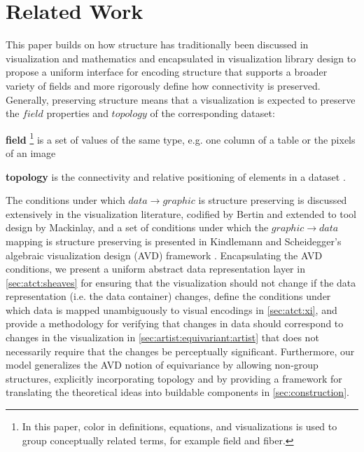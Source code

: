 \documentclass[review]{vgtc}
\theoremstyle{definition}
\theoremstyle{remark}
\begin{document}
\section{Related Work}
\label{sec:related-work}

This paper builds on how structure has traditionally been discussed in visualization and mathematics and encapsulated in visualization library design to propose a uniform interface for encoding structure that supports a broader variety of fields and more rigorously define how connectivity is preserved. Generally, preserving structure means that a visualization is expected to preserve the $field$ properties and $topology$ of the corresponding dataset:

\begin{LaTeXdescription}
  \item[\textcolor{fiber}{\textbf{field}}]\footnote{In this paper, color in definitions, equations, and visualizations is used to group conceptually related terms\cite{headMathAugmentationHow2022}, for example \textcolor{fiber}{field} and \textcolor{fiber}{fiber}.} is a set of values of the same type, e.g. one column of a table or the pixels of an image
  \item[\textcolor{base}{\textbf{topology}}] is the connectivity and relative positioning of elements in a dataset \cite{wilkinsonGrammarGraphics2005}.
\end{LaTeXdescription}

The conditions under which $data \rightarrow graphic$ is structure preserving is discussed extensively in the visualization literature, codified by Bertin\cite{bertinSemiologyGraphicsDiagrams2011} and extended to tool design by Mackinlay\cite{mackinlayAutomaticDesignGraphical1987}, and a set of conditions under which the $graphic \rightarrow data$ mapping is structure preserving is presented in Kindlemann and Scheidegger's algebraic visualization design (AVD) framework \cite{kindlmannAlgebraicProcessVisualization2014}. Encapsulating the AVD conditions, we present a uniform abstract data representation layer in \autoref{sec:atct:sheaves} for ensuring that the visualization should not change if the data representation (i.e. the data container) changes, define the conditions under which data is mapped unambiguously to visual encodings \cite{ziemkiewiczEmbeddingInformationVisualization2009} in \autoref{sec:atct:xi}, and provide a methodology for verifying that changes in data should correspond to changes in the visualization in \autoref{sec:artist:equivariant:artist} that does not necessarily require that the changes be perceptually significant. Furthermore, our model generalizes the AVD notion of equivariance by allowing non-group structures, explicitly incorporating topology and by providing a framework for translating the theoretical ideas into buildable components in \autoref{sec:construction}.
\end{document}
